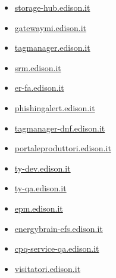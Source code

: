 \documentclass{article}
\begin{document}
\begin{itemize}
                
                \item \href{ http://storage-hub.edison.it/}{ storage-hub.edison.it }
            
                
                \item \href{ https://gatewaymi.edison.it/logon/LogonPoint/index.html}{ gatewaymi.edison.it }
            
                
                \item \href{ http://tagmanager.edison.it/}{ tagmanager.edison.it }
            
                
                \item \href{ http://srm.edison.it/}{ srm.edison.it }
            
                
                \item \href{ https://er-fa.edison.it/login/?next=/}{ er-fa.edison.it }
            
                
                \item \href{ https://phishingalert.edison.it/}{ phishingalert.edison.it }
            
                
                \item \href{ http://tagmanager-dnf.edison.it/}{ tagmanager-dnf.edison.it }
            
                
                \item \href{ http://portaleproduttori.edison.it/}{ portaleproduttori.edison.it }
            
                
                \item \href{ https://ty-dev.edison.it/}{ ty-dev.edison.it }
            
                
                \item \href{ https://ty-qa.edison.it/}{ ty-qa.edison.it }
            
                
                \item \href{ http://epm.edison.it/}{ epm.edison.it }
            
                
                \item \href{ http://energybrain-efs.edison.it/}{ energybrain-efs.edison.it }
            
                
                \item \href{ https://cpq-service-qa.edison.it/}{ cpq-service-qa.edison.it }
            
                
                \item \href{ https://visitatori.edison.it/}{ visitatori.edison.it }
            

\end{itemize}
\end{document}
